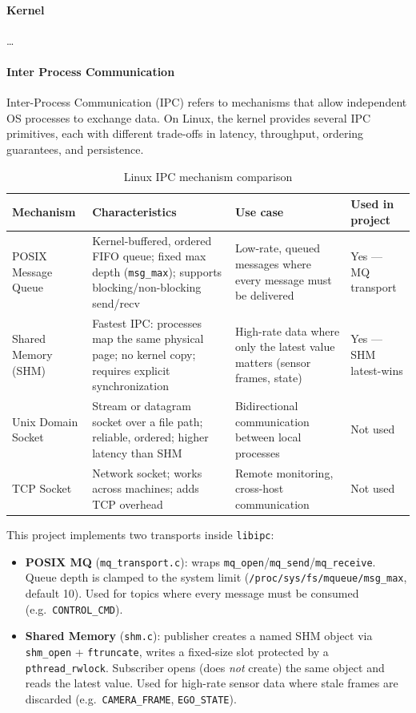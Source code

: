 \documentclass[12pt,a4paper]{article}
\begin{document}
\paragraph{Kernel}

\ldots

\paragraph{Inter Process Communication}

Inter-Process Communication (IPC) refers to mechanisms that allow independent OS processes to exchange data.
On Linux, the kernel provides several IPC primitives, each with different trade-offs in latency, throughput,
ordering guarantees, and persistence.

\begin{table}[H]
\centering
\begin{tabular}{lp{3.8cm}p{3.8cm}l}
\hline
\textbf{Mechanism} & \textbf{Characteristics} & \textbf{Use case} & \textbf{Used in project} \\
\hline
POSIX Message Queue
  & Kernel-buffered, ordered FIFO queue; fixed max depth (\texttt{msg\_max}); supports blocking/non-blocking send/recv
  & Low-rate, queued messages where every message must be delivered
  & Yes — MQ transport \\
\addlinespace
Shared Memory (SHM)
  & Fastest IPC: processes map the same physical page; no kernel copy; requires explicit synchronization
  & High-rate data where only the latest value matters (sensor frames, state)
  & Yes — SHM latest-wins \\
\addlinespace
Unix Domain Socket
  & Stream or datagram socket over a file path; reliable, ordered; higher latency than SHM
  & Bidirectional communication between local processes
  & Not used \\
\addlinespace
TCP Socket
  & Network socket; works across machines; adds TCP overhead
  & Remote monitoring, cross-host communication
  & Not used \\
\hline
\end{tabular}
\caption{Linux IPC mechanism comparison}
\end{table}

This project implements two transports inside \texttt{libipc}:

\begin{itemize}
  \item \textbf{POSIX MQ} (\texttt{mq\_transport.c}): wraps \texttt{mq\_open}/\texttt{mq\_send}/\texttt{mq\_receive}.
        Queue depth is clamped to the system limit (\texttt{/proc/sys/fs/mqueue/msg\_max}, default 10).
        Used for topics where every message must be consumed (e.g.\ \texttt{CONTROL\_CMD}).
  \item \textbf{Shared Memory} (\texttt{shm.c}): publisher creates a named SHM object via \texttt{shm\_open} +
        \texttt{ftruncate}, writes a fixed-size slot protected by a \texttt{pthread\_rwlock}.
        Subscriber opens (does \emph{not} create) the same object and reads the latest value.
        Used for high-rate sensor data where stale frames are discarded (e.g.\ \texttt{CAMERA\_FRAME}, \texttt{EGO\_STATE}).
\end{itemize}
\end{document}
